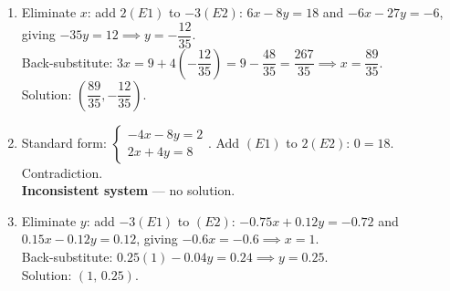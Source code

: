 \documentclass{ximera}
\begin{document}
\begin{problem}
\begin{solution}
\begin{enumerate}
  \item[(c)] Eliminate $x$: add $2(E1)$ to $-3(E2)$: $6x-8y=18$ and $-6x-27y=-6$, giving $-35y=12 \implies y=-\dfrac{12}{35}$.\\
  Back-substitute: $3x=9+4\!\left(-\dfrac{12}{35}\right)=9-\dfrac{48}{35}=\dfrac{267}{35} \implies x=\dfrac{89}{35}$.\\
  Solution: $\left(\dfrac{89}{35},-\dfrac{12}{35}\right)$.

  \item[(d)] Standard form: $\begin{cases} -4x-8y=2 \\ 2x+4y=8 \end{cases}$. Add $(E1)$ to $2(E2)$: $0=18$. Contradiction.\\
  \textbf{Inconsistent system} — no solution.

  \item[(e)] Eliminate $y$: add $-3(E1)$ to $(E2)$: $-0.75x+0.12y=-0.72$ and $0.15x-0.12y=0.12$, giving $-0.6x=-0.6 \implies x=1$.\\
  Back-substitute: $0.25(1)-0.04y=0.24 \implies y=0.25$.\\
  Solution: $(1,\,0.25)$.
\end{enumerate}
\end{solution}
\end{problem}
\end{document}
